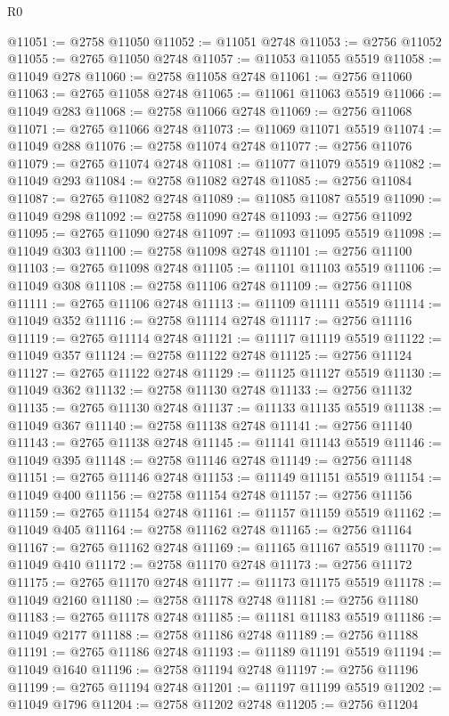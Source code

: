 \begin{lexlean}{R0}
\begin{coremodule}
@11051 := @2758 @11050
@11052 := @11051 @2748
@11053 := @2756 @11052
@11055 := @2765 @11050 @2748
@11057 := @11053 @11055 @5519
@11058 := @11049 @278
@11060 := @2758 @11058 @2748
@11061 := @2756 @11060
@11063 := @2765 @11058 @2748
@11065 := @11061 @11063 @5519
@11066 := @11049 @283
@11068 := @2758 @11066 @2748
@11069 := @2756 @11068
@11071 := @2765 @11066 @2748
@11073 := @11069 @11071 @5519
@11074 := @11049 @288
@11076 := @2758 @11074 @2748
@11077 := @2756 @11076
@11079 := @2765 @11074 @2748
@11081 := @11077 @11079 @5519
@11082 := @11049 @293
@11084 := @2758 @11082 @2748
@11085 := @2756 @11084
@11087 := @2765 @11082 @2748
@11089 := @11085 @11087 @5519
@11090 := @11049 @298
@11092 := @2758 @11090 @2748
@11093 := @2756 @11092
@11095 := @2765 @11090 @2748
@11097 := @11093 @11095 @5519
@11098 := @11049 @303
@11100 := @2758 @11098 @2748
@11101 := @2756 @11100
@11103 := @2765 @11098 @2748
@11105 := @11101 @11103 @5519
@11106 := @11049 @308
@11108 := @2758 @11106 @2748
@11109 := @2756 @11108
@11111 := @2765 @11106 @2748
@11113 := @11109 @11111 @5519
@11114 := @11049 @352
@11116 := @2758 @11114 @2748
@11117 := @2756 @11116
@11119 := @2765 @11114 @2748
@11121 := @11117 @11119 @5519
@11122 := @11049 @357
@11124 := @2758 @11122 @2748
@11125 := @2756 @11124
@11127 := @2765 @11122 @2748
@11129 := @11125 @11127 @5519
@11130 := @11049 @362
@11132 := @2758 @11130 @2748
@11133 := @2756 @11132
@11135 := @2765 @11130 @2748
@11137 := @11133 @11135 @5519
@11138 := @11049 @367
@11140 := @2758 @11138 @2748
@11141 := @2756 @11140
@11143 := @2765 @11138 @2748
@11145 := @11141 @11143 @5519
@11146 := @11049 @395
@11148 := @2758 @11146 @2748
@11149 := @2756 @11148
@11151 := @2765 @11146 @2748
@11153 := @11149 @11151 @5519
@11154 := @11049 @400
@11156 := @2758 @11154 @2748
@11157 := @2756 @11156
@11159 := @2765 @11154 @2748
@11161 := @11157 @11159 @5519
@11162 := @11049 @405
@11164 := @2758 @11162 @2748
@11165 := @2756 @11164
@11167 := @2765 @11162 @2748
@11169 := @11165 @11167 @5519
@11170 := @11049 @410
@11172 := @2758 @11170 @2748
@11173 := @2756 @11172
@11175 := @2765 @11170 @2748
@11177 := @11173 @11175 @5519
@11178 := @11049 @2160
@11180 := @2758 @11178 @2748
@11181 := @2756 @11180
@11183 := @2765 @11178 @2748
@11185 := @11181 @11183 @5519
@11186 := @11049 @2177
@11188 := @2758 @11186 @2748
@11189 := @2756 @11188
@11191 := @2765 @11186 @2748
@11193 := @11189 @11191 @5519
@11194 := @11049 @1640
@11196 := @2758 @11194 @2748
@11197 := @2756 @11196
@11199 := @2765 @11194 @2748
@11201 := @11197 @11199 @5519
@11202 := @11049 @1796
@11204 := @2758 @11202 @2748
@11205 := @2756 @11204

\end{coremodule}
\end{lexlean}
